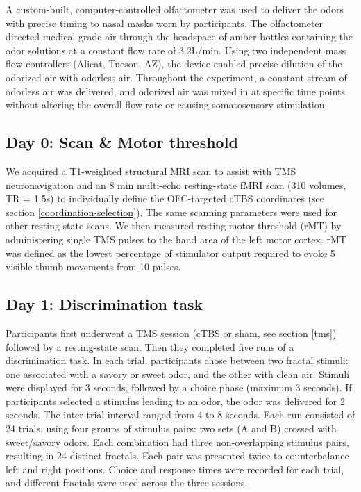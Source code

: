 \documentclass[lineno,sn-basic]{sn-jnl}%
\begin{document}
A custom-built, computer-controlled olfactometer was used to deliver the
odors with precise timing to nasal masks worn by participants. The
olfactometer directed medical-grade air through the headspace of amber
bottles containing the odor solutions at a constant flow rate of
3.2L/min. Using two independent mass flow controllers (Alicat, Tucson,
AZ), the device enabled precise dilution of the odorized air with
odorless air. Throughout the experiment, a constant stream of odorless
air was delivered, and odorized air was mixed in at specific time points
without altering the overall flow rate or causing somatosensory
stimulation.

\subsection{Day 0: Scan \& Motor threshold} 
\label{day-0-scan-motor-threshold}

We acquired a T1-weighted structural MRI scan to assist with TMS neuronavigation and an 8 min multi-echo resting-state fMRI scan (310 volumes, TR = 1.5s) to individually define the OFC-targeted cTBS coordinates (see section \ref{coordination-selection}). The same scanning parameters were used for
other resting-state scans. We then measured resting motor threshold (rMT) by administering single TMS pulses to the hand area of the left motor cortex. rMT was defined as the lowest percentage of stimulator output required to evoke 5 visible thumb movements from 10 pulses.

\subsection{Day 1: Discrimination task} 
\label{day-1-discrimination-task}

Participants first underwent a TMS session (cTBS or sham, see section \ref{tms}) followed by a resting-state scan. Then they completed five runs of a discrimination task. In each trial, participants chose between two
fractal stimuli: one associated with a savory or sweet odor, and the
other with clean air. Stimuli were displayed for 3 seconds, followed by
a choice phase (maximum 3 seconds). If participants selected a stimulus
leading to an odor, the odor was delivered for 2 seconds. The
inter-trial interval ranged from 4 to 8 seconds. Each run consisted of
24 trials, using four groups of stimulus pairs: two sets (A and B)
crossed with sweet/savory odors. Each combination had three
non-overlapping stimulus pairs, resulting in 24 distinct fractals. Each
pair was presented twice to counterbalance left and right positions.
Choice and response times were recorded for each trial, and different
fractals were used across the three sessions.
\end{document}
